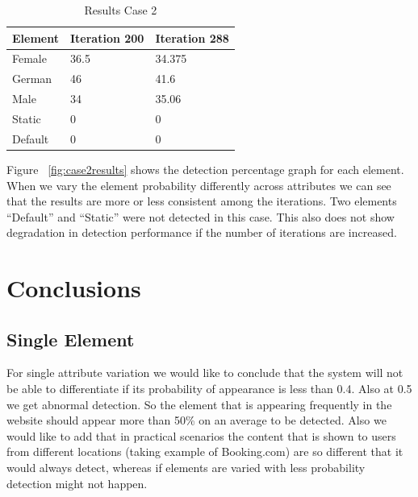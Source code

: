 \documentclass[fleqn,12pt]{SelfArx} %
\begin{document}
\begin{table}[h!]
	\begin{center}
    \begin{tabular}{| l | l | l |}
    \hline
    Element & Iteration 200 & Iteration 288 \\ \hline
    Female & 36.5 & 34.375\\ \hline
    German & 46 & 41.6\\ \hline
    Male & 34 & 35.06\\ \hline
    Static & 0 & 0\\ \hline
    Default & 0 & 0\\ \hline
    \hline
    \end{tabular}
    \caption{Results Case 2}
	\label{table:resultscase2}
    \end{center}
\end{table}
Figure ~\ref{fig:case2results} shows the detection percentage graph for each element. 
When we vary the element probability differently across attributes we can see that the results are more or less consistent among the iterations. Two elements “Default” and “Static” were not detected in this case. This also does not show degradation in detection performance if the number of iterations are increased.

\section{Conclusions}
\subsection{Single Element}
For single attribute variation we would like to conclude that the system will not be able to differentiate if its probability of appearance is less than 0.4. Also at 0.5 we get abnormal detection. So the element that is appearing frequently in the website should appear more than 50\% on an average to be detected. Also we would like to add that in practical scenarios the content that is shown to users from different locations (taking example of Booking.com) are so different that it would always detect, whereas if elements are varied with less probability detection might not happen.
\end{document}

